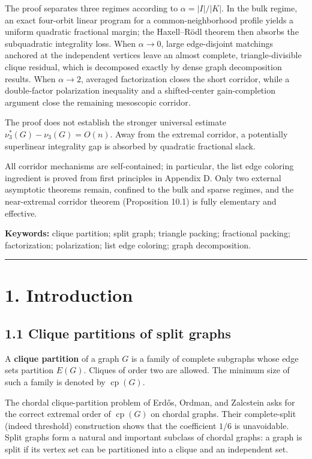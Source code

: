 \documentclass[
  11pt,
]{article}
\begin{document}
The proof separates three regimes according to \(\alpha=|I|/|K|\). In
the bulk regime, an exact four-orbit linear program for a
common-neighborhood profile yields a uniform quadratic fractional
margin; the Haxell--Rödl theorem then absorbs the subquadratic
integrality loss. When \(\alpha\to0\), large edge-disjoint matchings
anchored at the independent vertices leave an almost complete,
triangle-divisible clique residual, which is decomposed exactly by dense
graph decomposition results. When \(\alpha\to2\), averaged factorization
closes the short corridor, while a double-factor polarization inequality
and a shifted-center gain-completion argument close the remaining
mesoscopic corridor.

The proof does not establish the stronger universal estimate
\(\nu_3^*(G)-\nu_3(G)=O(n)\). Away from the extremal corridor, a
potentially superlinear integrality gap is absorbed by quadratic
fractional slack.

All corridor mechanisms are self-contained; in particular, the list edge
coloring ingredient is proved from first principles in Appendix D. Only
two external asymptotic theorems remain, confined to the bulk and sparse
regimes, and the near-extremal corridor theorem (Proposition 10.1) is
fully elementary and effective.

\textbf{Keywords:} clique partition; split graph; triangle packing;
fractional packing; factorization; polarization; list edge coloring;
graph decomposition.

\begin{center}\rule{0.5\linewidth}{0.5pt}\end{center}

\section{1. Introduction}\label{introduction}

\subsection{1.1 Clique partitions of split
graphs}\label{clique-partitions-of-split-graphs}

A \textbf{clique partition} of a graph \(G\) is a family of complete
subgraphs whose edge sets partition \(E(G)\). Cliques of order two are
allowed. The minimum size of such a family is denoted by
\(\operatorname{cp}(G)\).

The chordal clique-partition problem of Erdős, Ordman, and Zalcstein
asks for the correct extremal order of \(\operatorname{cp}(G)\) on
chordal graphs. Their complete-split (indeed threshold) construction
shows that the coefficient \(1/6\) is unavoidable. Split graphs form a
natural and important subclass of chordal graphs: a graph is split if
its vertex set can be partitioned into a clique and an independent set.
\end{document}
